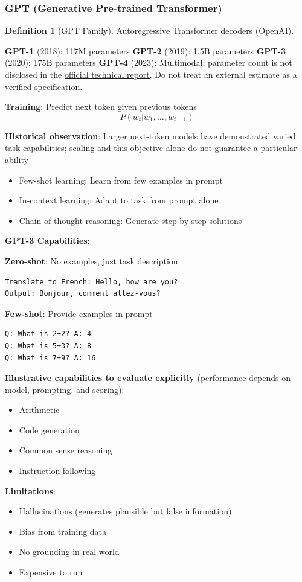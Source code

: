 \documentclass[11pt,twoside]{article}
\numberwithin{equation}{section}
\theoremstyle{plain}
\theoremstyle{definition}
\newtheorem{definition}[theorem]{Definition}
\theoremstyle{remark}
\newenvironment{keyidea}{
  \begin{tcolorbox}[colback=yellow!5!white,
                    colframe=yellow!50!black,
                    title=Key Idea,
                    breakable,
                    enhanced,
                    sharp corners,
                    boxrule=0.8pt,
                    left=6pt, right=6pt, top=6pt, bottom=6pt]
}{
  \end{tcolorbox}
}
\begin{document}
\subsubsection{GPT (Generative Pre-trained Transformer)}

\begin{definition}[GPT Family]
Autoregressive Transformer decoders (OpenAI).

\textbf{GPT-1} (2018): 117M parameters
\textbf{GPT-2} (2019): 1.5B parameters
\textbf{GPT-3} (2020): 175B parameters
\textbf{GPT-4} (2023): Multimodal; parameter count is not disclosed in the \href{https://cdn.openai.com/papers/gpt-4.pdf}{official technical report}. Do not treat an external estimate as a verified specification.

\textbf{Training}: Predict next token given previous tokens
\[
P(w_t | w_1, \ldots, w_{t-1})
\]

\textbf{Historical observation}: Larger next-token models have demonstrated varied task capabilities; scaling and this objective alone do not guarantee a particular ability
\begin{itemize}
\item Few-shot learning: Learn from few examples in prompt
\item In-context learning: Adapt to task from prompt alone
\item Chain-of-thought reasoning: Generate step-by-step solutions
\end{itemize}
\end{definition}

\begin{keyidea}
\textbf{GPT-3 Capabilities}:

\textbf{Zero-shot}: No examples, just task description
\begin{verbatim}
Translate to French: Hello, how are you?
Output: Bonjour, comment allez-vous?
\end{verbatim}

\textbf{Few-shot}: Provide examples in prompt
\begin{verbatim}
Q: What is 2+2? A: 4
Q: What is 5+3? A: 8
Q: What is 7+9? A: 16
\end{verbatim}

\textbf{Illustrative capabilities to evaluate explicitly} (performance depends on model, prompting, and scoring):
\begin{itemize}
\item Arithmetic
\item Code generation
\item Common sense reasoning
\item Instruction following
\end{itemize}

\textbf{Limitations}:
\begin{itemize}
\item Hallucinations (generates plausible but false information)
\item Bias from training data
\item No grounding in real world
\item Expensive to run
\end{itemize}
\end{keyidea}
\end{document}
